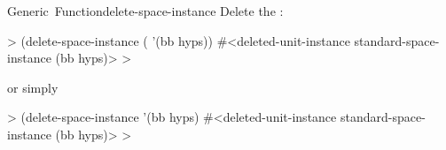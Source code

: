 \documentclass[10pt,twoside,english,pdftex]{article}
\begin{document}
\begin{functiondoc}{Generic~Function}{delete-space-instance}
\fnexamples
{}%
Delete the  :
%
\W\supp
\begin{example}
  > (delete-space-instance ( '(bb hyps))
  #<deleted-unit-instance standard-space-instance (bb hyps)>
  >
\end{example}
%
or simply
%
\W\supp\notpretop
\begin{example}
  > (delete-space-instance '(bb hyps)
  #<deleted-unit-instance standard-space-instance (bb hyps)>
  >
\end{example}

\end{functiondoc}

\end{document}
